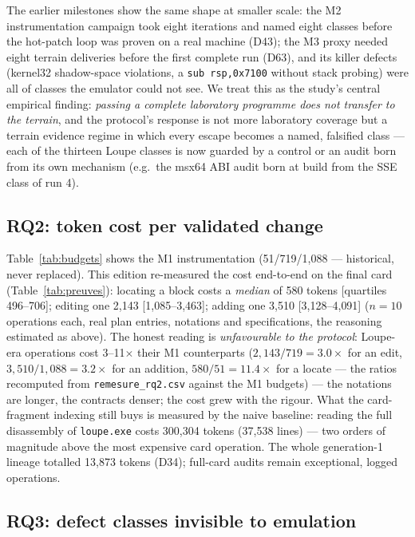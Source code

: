 \documentclass[11pt,a4paper]{article}
\newcommand{\code}[1]{\texttt{\small #1}}
\begin{document}
The earlier milestones show the same shape at smaller scale: the M2
instrumentation campaign took eight iterations and named eight classes
before the hot-patch loop was proven on a real machine (D43); the M3
proxy needed eight terrain deliveries before the first complete run
(D63), and its killer defects (kernel32 shadow-space violations, a
\code{sub rsp,0x7100} without stack probing) were all of classes the
emulator could not see. We treat this as the study's central empirical
finding: \emph{passing a complete laboratory programme does not transfer
to the terrain}, and the protocol's response is not more laboratory
coverage but a terrain evidence regime in which every escape becomes a
named, falsified class --- each of the thirteen Loupe classes is now
guarded by a control or an audit born from its own mechanism (e.g.\ the
msx64 ABI audit born at build from the SSE class of run 4).

\subsection{RQ2: token cost per validated change}\label{sec:rq2}

Table~\ref{tab:budgets} shows the M1 instrumentation (51/719/1{,}088 ---
historical, never replaced). This edition re-measured the cost end-to-end
on the final card (Table~\ref{tab:preuves}): locating a block costs a
\emph{median} of 580 tokens [quartiles 496--706]; editing one 2{,}143
[1{,}085--3{,}463]; adding one 3{,}510 [3{,}128--4{,}091] ($n{=}10$
operations each, real plan entries, notations and specifications, the
reasoning estimated as above). The honest reading is \emph{unfavourable
to the protocol}: Loupe-era operations cost 3--11$\times$ their M1
counterparts ($2{,}143/719 = 3.0\times$ for an edit,
$3{,}510/1{,}088 = 3.2\times$ for an addition, $580/51 = 11.4\times$
for a locate --- the ratios recomputed from \code{remesure\_rq2.csv}
against the M1 budgets) --- the notations are longer, the contracts
denser; the
cost grew with the rigour. What the card-fragment indexing still buys is
measured by the naive baseline: reading the full disassembly of
\code{loupe.exe} costs 300{,}304 tokens (37{,}538 lines) --- two orders
of magnitude above the most expensive card operation. The whole
generation-1 lineage totalled 13{,}873 tokens (D34); full-card audits
remain exceptional, logged operations.

\subsection{RQ3: defect classes invisible to emulation}\label{sec:rq3}
\end{document}
